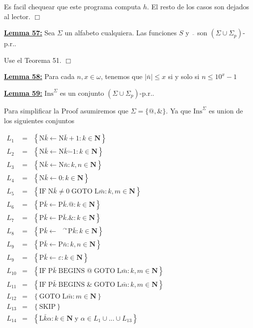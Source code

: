 Es facil chequear que este programa computa \(h.\)
El resto de los casos son dejados al lector. \(\Box\)


\textbf{\underline{Lemma 57:}} Sea \(\Sigma \) un alfabeto cualquiera. Las funciones \(S\) y \(\overline{\ \;}\) son \((\Sigma \cup \Sigma _{p})\)-p.r..

\PROOF Use el Teorema 51. \(\Box\)

\textbf{\underline{Lemma 58:}} Para cada \(n,x\in \omega \), tenemos que \( \left\vert \bar{n}\right\vert \leq x\) si y solo si \(n\leq 10^{x}-1\)

\textbf{\underline{Lemma 59:}} \(\mathrm{Ins}^{\Sigma }\) es un conjunto \((\Sigma \cup \Sigma _{p})\)-p.r..

\PROOF Para simplificar la Proof asumiremos que \(\Sigma =\{@,\& \}\). Ya que \( \mathrm{Ins}^{\Sigma }\) es union de los siguientes conjuntos

\(\displaystyle \begin{array}{rcl} L_{1} & =& \left\{ \mathrm{N}\bar{k}\leftarrow \mathrm{N}\bar{k}+1:k\in \mathbf{N}\right\} \\ L_{2} & =& \left\{ \mathrm{N}\bar{k}\leftarrow \mathrm{N}\bar{k}\dot{-}1:k\in \mathbf{N}\right\} \\ L_{3} & =& \left\{ \mathrm{N}\bar{k}\leftarrow \mathrm{N}\bar{n}:k,n\in \mathbf{N}\right\} \\ L_{4} & =& \left\{ \mathrm{N}\bar{k}\leftarrow 0:k\in \mathbf{N}\right\} \\ L_{5} & =& \left\{ \mathrm{IF}\;\mathrm{N}\bar{k}\neq 0\;\mathrm{GOTO}\; \mathrm{L}\bar{m}:k,m\in \mathbf{N}\right\} \\ L_{6} & =& \left\{ \mathrm{P}\bar{k}\leftarrow \mathrm{P}\bar{k}.@:k\in \mathbf{N}\right\} \\ L_{7} & =& \left\{ \mathrm{P}\bar{k}\leftarrow \mathrm{P}\bar{k}.\& :k\in \mathbf{N}\right\} \\ L_{8} & =& \left\{ \mathrm{P}\bar{k}\leftarrow \text{ }^{\curvearrowright } \mathrm{P}\bar{k}:k\in \mathbf{N}\right\} \\ L_{9} & =& \left\{ \mathrm{P}\bar{k}\leftarrow \mathrm{P}\bar{n}:k,n\in \mathbf{N}\right\} \\ L_{9} & =& \left\{ \mathrm{P}\bar{k}\leftarrow \varepsilon :k\in \mathbf{N} \right\} \\ L_{10} & =& \left\{ \mathrm{IF}\;\mathrm{P}\bar{k}\;\mathrm{BEGINS}\;@\; \mathrm{GOTO}\;\mathrm{L}\bar{m}:k,m\in \mathbf{N}\right\} \\ L_{11} & =& \left\{ \mathrm{IF}\;\mathrm{P}\bar{k}\;\mathrm{BEGINS}\;\& \; \mathrm{GOTO}\;\mathrm{L}\bar{m}:k,m\in \mathbf{N}\right\} \\ L_{12} & =& \left\{ \mathrm{GOTO}\;\mathrm{L}\bar{m}:m\in \mathbf{N}\right\} \\ L_{13} & =& \left\{ \mathrm{SKIP}\right\} \\ L_{14} & =& \left\{ \mathrm{L}\bar{k}\alpha :k\in \mathbf{N\;}\text{y }\alpha \in L_{1}\cup ...\cup L_{13}\right\} \end{array} \)

